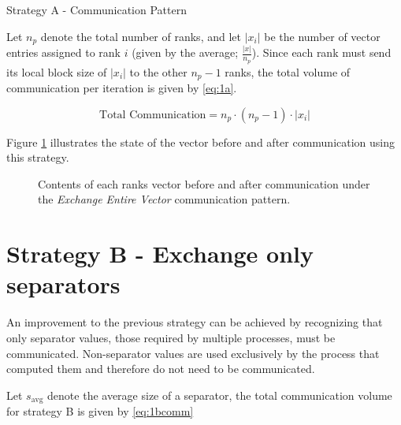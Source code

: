\begin{algorithm}[H]
    \label{alg:1acomm}
    \caption{Strategy A - Communication Pattern}
    \SetAlgoVlined
\end{algorithm}
\medskip

Let \(n_{p}\) denote the total number of ranks, and let \(\left| x_{i} \right|\) be the number of vector entries assigned to rank \(i\) (given by the average; \(\frac{\left| x \right|}{n_{p}}\)). Since each rank must send its local block size of \(\left| x_{i} \right|\) to the other \(n_{p}-1\) ranks, the total volume of communication per iteration is given by \ref{eq:1a}.


\begin{equation}
    \label{eq:1a}
    \text{Total Communication} = n_{p} \cdot  (n_{p}-1) \cdot \left| x_{i} \right|
\end{equation}

Figure \ref{fig:1acomm} illustrates the state of the vector before and after communication using this strategy.

\begin{figure}[H]
    \centering
    \caption{Contents of each ranks vector before and after communication under the \textit{Exchange Entire Vector} communication pattern.}
    \label{fig:1acomm}
\end{figure}

\section{Strategy B - Exchange only separators}
An improvement to the previous strategy can be achieved by recognizing that only separator values, those required by multiple processes, must be communicated. Non-separator values are used exclusively by the process that computed them and therefore do not need to be communicated. 
\medskip

Let \(s_{\text{avg}}\) denote the average size of a separator, the total communication volume for strategy B is given by \ref{eq:1bcomm}

